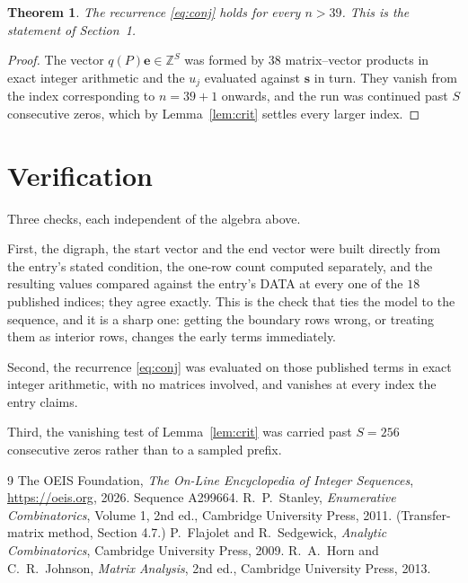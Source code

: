 \documentclass[11pt,a4paper]{article}
\theoremstyle{plain}
\newtheorem{theorem}{Theorem}
\theoremstyle{definition}
\begin{document}
\begin{theorem}
The recurrence \eqref{eq:conj} holds for every $n>39$. This is the statement of
Section~1.
\end{theorem}

\begin{proof}
The vector $q(P)\mathbf{e}\in\mathbb{Z}^{S}$ was formed by $38$ matrix--vector
products in exact integer arithmetic and the $u_j$ evaluated against $\mathbf{s}$ in turn.
They vanish from the index corresponding to $n=39+1$ onwards, and the run was continued
past $S$ consecutive zeros, which by Lemma~\ref{lem:crit} settles every larger index.
\end{proof}

\section{Verification}

Three checks, each independent of the algebra above.

First, the digraph, the start vector and the end vector were built directly from the
entry's stated condition, the one-row count computed separately, and the resulting values
compared against the entry's DATA at every one of the $18$ published indices; they
agree exactly. This is the check that ties the model to the sequence, and it is a sharp one:
getting the boundary rows wrong, or treating them as interior rows, changes the early terms
immediately.

Second, the recurrence \eqref{eq:conj} was evaluated on those published terms in exact
integer arithmetic, with no matrices involved, and vanishes at every index the entry claims.

Third, the vanishing test of Lemma~\ref{lem:crit} was carried past $S=256$ consecutive
zeros rather than to a sampled prefix.

\begin{thebibliography}{9}
 The OEIS Foundation, \emph{The On-Line Encyclopedia of Integer
Sequences}, \url{https://oeis.org}, 2026. Sequence A299664.
 R.~P.~Stanley, \emph{Enumerative Combinatorics}, Volume 1, 2nd ed.,
Cambridge University Press, 2011. (Transfer-matrix method, Section 4.7.)
 P.~Flajolet and R.~Sedgewick, \emph{Analytic Combinatorics}, Cambridge
University Press, 2009.
 R.~A.~Horn and C.~R.~Johnson, \emph{Matrix Analysis}, 2nd ed., Cambridge
University Press, 2013.
\end{thebibliography}
\end{document}
